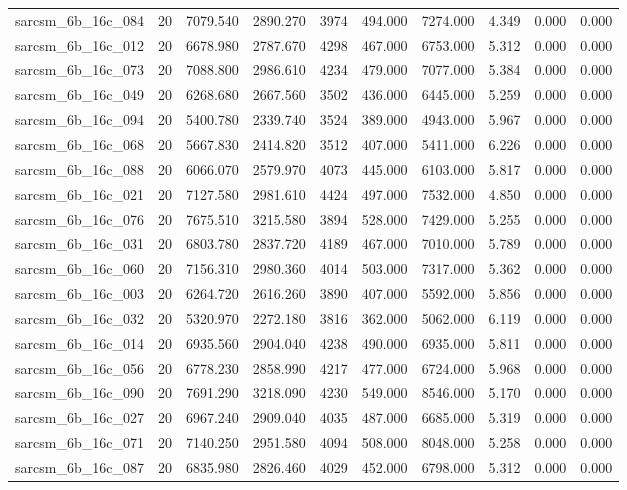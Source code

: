 \begin{tabular}{lrrrrrrrrr}
sarcsm\_6b\_16c\_084 & 20 & 7079.540 & 2890.270 & 3974 & 494.000 & 7274.000 & 4.349 & 0.000 & 0.000 \\
sarcsm\_6b\_16c\_012 & 20 & 6678.980 & 2787.670 & 4298 & 467.000 & 6753.000 & 5.312 & 0.000 & 0.000 \\
sarcsm\_6b\_16c\_073 & 20 & 7088.800 & 2986.610 & 4234 & 479.000 & 7077.000 & 5.384 & 0.000 & 0.000 \\
sarcsm\_6b\_16c\_049 & 20 & 6268.680 & 2667.560 & 3502 & 436.000 & 6445.000 & 5.259 & 0.000 & 0.000 \\
sarcsm\_6b\_16c\_094 & 20 & 5400.780 & 2339.740 & 3524 & 389.000 & 4943.000 & 5.967 & 0.000 & 0.000 \\
sarcsm\_6b\_16c\_068 & 20 & 5667.830 & 2414.820 & 3512 & 407.000 & 5411.000 & 6.226 & 0.000 & 0.000 \\
sarcsm\_6b\_16c\_088 & 20 & 6066.070 & 2579.970 & 4073 & 445.000 & 6103.000 & 5.817 & 0.000 & 0.000 \\
sarcsm\_6b\_16c\_021 & 20 & 7127.580 & 2981.610 & 4424 & 497.000 & 7532.000 & 4.850 & 0.000 & 0.000 \\
sarcsm\_6b\_16c\_076 & 20 & 7675.510 & 3215.580 & 3894 & 528.000 & 7429.000 & 5.255 & 0.000 & 0.000 \\
sarcsm\_6b\_16c\_031 & 20 & 6803.780 & 2837.720 & 4189 & 467.000 & 7010.000 & 5.789 & 0.000 & 0.000 \\
sarcsm\_6b\_16c\_060 & 20 & 7156.310 & 2980.360 & 4014 & 503.000 & 7317.000 & 5.362 & 0.000 & 0.000 \\
sarcsm\_6b\_16c\_003 & 20 & 6264.720 & 2616.260 & 3890 & 407.000 & 5592.000 & 5.856 & 0.000 & 0.000 \\
sarcsm\_6b\_16c\_032 & 20 & 5320.970 & 2272.180 & 3816 & 362.000 & 5062.000 & 6.119 & 0.000 & 0.000 \\
sarcsm\_6b\_16c\_014 & 20 & 6935.560 & 2904.040 & 4238 & 490.000 & 6935.000 & 5.811 & 0.000 & 0.000 \\
sarcsm\_6b\_16c\_056 & 20 & 6778.230 & 2858.990 & 4217 & 477.000 & 6724.000 & 5.968 & 0.000 & 0.000 \\
sarcsm\_6b\_16c\_090 & 20 & 7691.290 & 3218.090 & 4230 & 549.000 & 8546.000 & 5.170 & 0.000 & 0.000 \\
sarcsm\_6b\_16c\_027 & 20 & 6967.240 & 2909.040 & 4035 & 487.000 & 6685.000 & 5.319 & 0.000 & 0.000 \\
sarcsm\_6b\_16c\_071 & 20 & 7140.250 & 2951.580 & 4094 & 508.000 & 8048.000 & 5.258 & 0.000 & 0.000 \\
sarcsm\_6b\_16c\_087 & 20 & 6835.980 & 2826.460 & 4029 & 452.000 & 6798.000 & 5.312 & 0.000 & 0.000 \\

\end{tabular}

